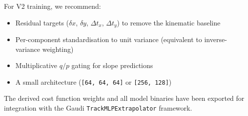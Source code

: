 \documentclass[11pt,a4paper]{article}
\newcommand{\qop}{q/p}
\newcommand{\tx}{t_x}
\newcommand{\ty}{t_y}
\begin{document}
For V2 training, we recommend:
\begin{itemize}[nosep]
  \item Residual targets ($\delta x$, $\delta y$, $\Delta\tx$, $\Delta\ty$) to remove the kinematic baseline
  \item Per-component standardisation to unit variance (equivalent to inverse-variance weighting)
  \item Multiplicative $\qop$ gating for slope predictions
  \item A small architecture (\texttt{[64, 64, 64]} or \texttt{[256, 128]})
\end{itemize}

The derived cost function weights and all model binaries have been exported for integration with the Gaudi \texttt{TrackMLPExtrapolator} framework.
\end{document}
